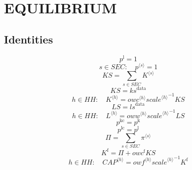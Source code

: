 \section{EQUILIBRIUM}

\subsection{Identities}

\begin{equation}
p^{\mathrm{l}} = 1
\end{equation}
\begin{equation}
s\in {S\!E\!C}\colon\quad {p}^{\langle s\rangle} = 1
\end{equation}
\begin{equation}
{K\!S} = \sum_{s\in {S\!E\!C}} {K}^{\langle s\rangle}
\end{equation}
\begin{equation}
{K\!S} = {k\!s}^{\mathrm{data}}
\end{equation}
\begin{equation}
h\in {H\!H}\colon\quad {K}^{\langle h\rangle} = {{{o\!w\!c}}^{\langle h\rangle}} {{{s\!c\!a\!l\!e}}^{\langle h\rangle}}^{-1} {{K\!S}}
\end{equation}
\begin{equation}
{L\!S} = {l\!s}^{\mathrm{data}}
\end{equation}
\begin{equation}
h\in {H\!H}\colon\quad {L}^{\langle h\rangle} = {{{o\!w\!w}}^{\langle h\rangle}} {{{s\!c\!a\!l\!e}}^{\langle h\rangle}}^{-1} {{L\!S}}
\end{equation}
\begin{equation}
p^{\mathrm{kc}} = p^{\mathrm{k}}
\end{equation}
\begin{equation}
p^{\mathrm{lc}} = p^{\mathrm{l}}
\end{equation}
\begin{equation}
\Pi = \sum_{s\in {S\!E\!C}} {\pi}^{\langle s\rangle}
\end{equation}
\begin{equation}
K^{\mathrm{f}} = \Pi + {{o\!w\!c}^{\mathrm{f}}} {{K\!S}}
\end{equation}
\begin{equation}
h\in {H\!H}\colon\quad {{C\!A\!P}}^{\langle h\rangle} = {{{o\!w\!f}}^{\langle h\rangle}} {{{s\!c\!a\!l\!e}}^{\langle h\rangle}}^{-1} {K^{\mathrm{f}}}
\end{equation}




